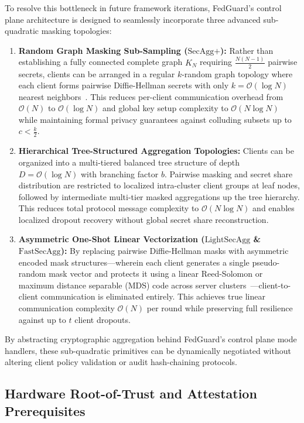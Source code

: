 To resolve this bottleneck in future framework iterations, FedGuard's control plane architecture is designed to seamlessly incorporate three advanced sub-quadratic masking topologies:
\begin{enumerate}
    \item \textbf{Random Graph Masking Sub-Sampling ($\text{SecAgg+}$):} Rather than establishing a fully connected complete graph $K_N$ requiring $\frac{N(N-1)}{2}$ pairwise secrets, clients can be arranged in a regular $k$-random graph topology where each client forms pairwise Diffie-Hellman secrets with only $k = \mathcal{O}(\log N)$ nearest neighbors~\cite{bell2020secagg}. This reduces per-client communication overhead from $\mathcal{O}(N)$ to $\mathcal{O}(\log N)$ and global key setup complexity to $\mathcal{O}(N \log N)$ while maintaining formal privacy guarantees against colluding subsets up to $c < \frac{k}{2}$.
    \item \textbf{Hierarchical Tree-Structured Aggregation Topologies:} Clients can be organized into a multi-tiered balanced tree structure of depth $D = \mathcal{O}(\log N)$ with branching factor $b$. Pairwise masking and secret share distribution are restricted to localized intra-cluster client groups at leaf nodes, followed by intermediate multi-tier masked aggregations up the tree hierarchy. This reduces total protocol message complexity to $\mathcal{O}(N \log N)$ and enables localized dropout recovery without global secret share reconstruction.
    \item \textbf{Asymmetric One-Shot Linear Vectorization ($\text{LightSecAgg}$ \& $\text{FastSecAgg}$):} By replacing pairwise Diffie-Hellman masks with asymmetric encoded mask structures—wherein each client generates a single pseudo-random mask vector and protects it using a linear Reed-Solomon or maximum distance separable (MDS) code across server clusters~\cite{so2021lightsecagg}—client-to-client communication is eliminated entirely. This achieves true linear communication complexity $\mathcal{O}(N)$ per round while preserving full resilience against up to $t$ client dropouts.
\end{enumerate}
By abstracting cryptographic aggregation behind FedGuard's control plane mode handlers, these sub-quadratic primitives can be dynamically negotiated without altering client policy validation or audit hash-chaining protocols.

\subsection{Hardware Root-of-Trust and Attestation Prerequisites}

